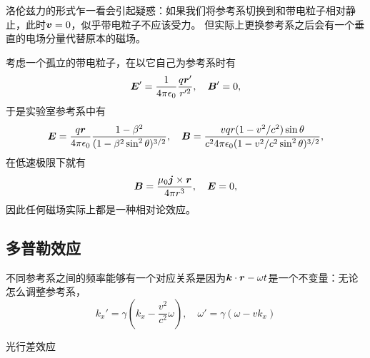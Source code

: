\documentclass[UTF8, a4paper]{ctexart}
\begin{document}
洛伦兹力的形式乍一看会引起疑惑：如果我们将参考系切换到和带电粒子相对静止，此时$\vb*{v}=0$，似乎带电粒子不应该受力。
但实际上更换参考系之后会有一个垂直的电场分量代替原本的磁场。

考虑一个孤立的带电粒子，在以它自己为参考系时有
\[
    \vb*{E}' = \frac{1}{4\pi \epsilon_0} \frac{q \vb*{r}'}{r'^2}, \quad \vb*{B}'=0,
\]
于是实验室参考系中有
\begin{equation}
    \vb*{E} = \frac{q \vb*{r}}{4\pi \epsilon_0} \frac{1 - \beta^2}{(1 - \beta^2 \sin^2\theta)^{3/2}}, \quad \vb*{B} = \frac{vqr (1 - v^2/c^2) \sin \theta}{c^2 4\pi \epsilon_0 (1 - v^2/c^2 \sin^2\theta)^{3/2}},
\end{equation}
在低速极限下就有
\begin{equation}
    \vb*{B} = \frac{\mu_0 \vb*{j} \times \vb*{r}}{4\pi r^3}, \quad \vb*{E} = 0,
\end{equation}
因此任何磁场实际上都是一种相对论效应。

\subsection{多普勒效应}

不同参考系之间的频率能够有一个对应关系是因为$\vb*{k} \cdot \vb*{r} - \omega t$是一个不变量：无论怎么调整参考系，
\begin{equation}
    k_x' = \gamma (k_x - \frac{v^2}{c^2} \omega), \quad \omega' = \gamma (\omega - v k_x)
\end{equation}

光行差效应
\end{document}
